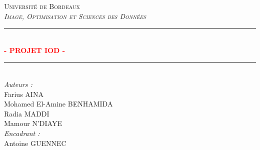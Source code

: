\documentclass[a4paper, 12pt]{report} %
\newcommand{\HRule}{\rule{\linewidth}{0.5mm}}
\begin{document}
 

\everymath{\displaystyle}


\begin{titlepage}
\begin{center} %

\textsc{\huge Université de Bordeaux} \\[2cm]

\textsc{\large \textit{Image, Optimisation et Sciences des Données}} \\[0.5cm] 

\HRule \\[0.6cm]
{\huge\bfseries\textcolor{Red}{- PROJET IOD -}} \\[0.25cm]
\HRule \\[1.5cm]

\Large\textit{Auteurs :} \\[0.5cm]
Farius \textsc{AINA} \\[0.5cm]
Mohamed El-Amine \textsc{BENHAMIDA} \\[0.5cm]
Radia \textsc{MADDI} \\[0.5cm]
Mamour \textsc{N'DIAYE} \\[2.5cm]

\Large\textit{Encadrant :} \\[0.5cm]
Antoine \textsc{GUENNEC} \\[0.5cm]

\end{center}
\end{titlepage}


\setcounter{tocdepth}{1} 
\end{document}
